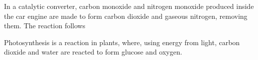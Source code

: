 In a catalytic converter, carbon monoxide and nitrogen monoxide produced inside the car engine
are made to form carbon dioxide and gaseous nitrogen, removing them. The reaction follows
\begin{center}
\end{center}

Photosynthesis is a reaction in plants, where, using energy from light, carbon dioxide and water
are reacted to form glucose and oxygen.
\begin{center}

\end{center}
